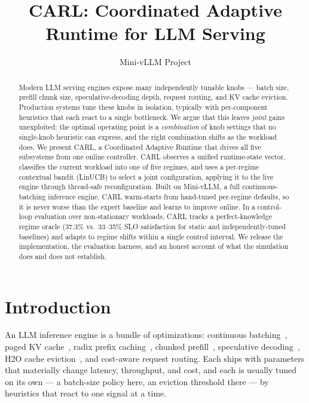\documentclass[10pt,twocolumn]{article}
\title{\textbf{CARL: Coordinated Adaptive Runtime for LLM Serving}}
\author{Mini-vLLM Project}
\date{}
\begin{document}
\maketitle

\begin{abstract}
Modern LLM serving engines expose many independently tunable knobs --- batch
size, prefill chunk size, speculative-decoding depth, request routing, and KV
cache eviction. Production systems tune these knobs in isolation, typically with
per-component heuristics that each react to a single bottleneck. We argue that
this leaves \emph{joint} gains unexploited: the optimal operating point is a
\emph{combination} of knob settings that no single-knob heuristic can express,
and the right combination shifts as the workload does. We present CARL, a
Coordinated Adaptive Runtime that drives all five subsystems from one online
controller. CARL observes a unified runtime-state vector, classifies the current
workload into one of five regimes, and uses a per-regime contextual bandit
(LinUCB) to select a joint configuration, applying it to the live engine through
thread-safe reconfiguration. Built on Mini-vLLM, a full continuous-batching
inference engine, CARL warm-starts from hand-tuned per-regime defaults, so it is
never worse than the expert baseline and learns to improve online. In a
control-loop evaluation over non-stationary workloads, CARL tracks a
perfect-knowledge regime oracle (37.3\% vs.\ 33--35\% SLO satisfaction for static
and independently-tuned baselines) and adapts to regime shifts within a single
control interval. We release the implementation, the evaluation harness, and an
honest account of what the simulation does and does not establish.
\end{abstract}

\section{Introduction}
\label{sec:intro}

An LLM inference engine is a bundle of optimizations: continuous
batching~\cite{yu2022orca}, paged KV cache~\cite{kwon2023vllm}, radix prefix
caching~\cite{zheng2024sglang}, chunked prefill~\cite{agrawal2024sarathiserve},
speculative decoding~\cite{leviathan2023speculative}, H2O cache
eviction~\cite{zhang2023h2o}, and cost-aware request routing. Each ships with
parameters that materially change latency, throughput, and cost, and each is
usually tuned on its own --- a batch-size policy here, an eviction threshold
there --- by heuristics that react to one signal at a time.
\end{document}
